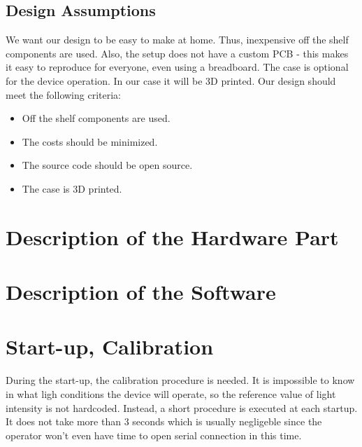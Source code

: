 \documentclass[12pt]{article}
\begin{document}
	\subsection{Design Assumptions}
  We want our design to be easy to make at home. Thus, inexpensive off the shelf components are used.
  Also, the setup does not have a custom PCB - this makes it easy to reproduce for everyone, even using a breadboard.	
  The case is optional for the device operation. In our case it will be 3D printed.
  Our design should meet the following criteria:
  \begin{itemize}
    \item Off the shelf components are used.
    \item The costs should be minimized.
    \item The source code should be open source.
    \item The case is 3D printed.
  \end{itemize}
	\section{Description of the Hardware Part}
	
	\section{Description of the Software}
	
	\section{Start-up, Calibration}
  During the start-up, the calibration procedure is needed. It is impossible to know in what ligh conditions the device will operate, so the reference value of light intensity is not hardcoded.
  Instead, a short procedure is executed at each startup. It does not take more than 3 seconds which is usually negligeble since the operator won't even have time to open serial connection in this time.
	
\end{document}
